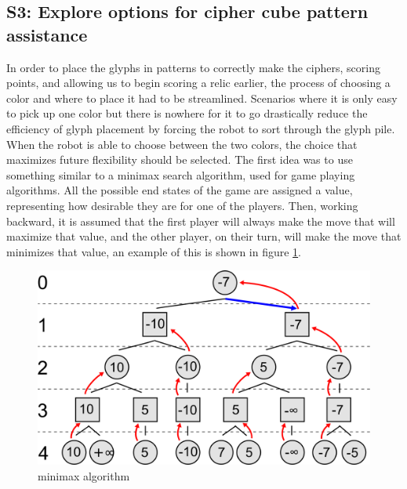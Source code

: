 \documentclass{article}
\begin{document}
\subsection{S3: Explore options for cipher cube pattern assistance}

In order to place the glyphs in patterns to correctly make the ciphers, scoring points, and allowing us to begin scoring a relic earlier, the process of choosing a color and where to place it had to be streamlined. Scenarios where it is only easy to pick up one color but there is nowhere for it to go drastically reduce the efficiency of glyph placement by forcing the robot to sort through the glyph pile. When the robot is able to choose between the two colors, the choice that maximizes future flexibility should be selected. The first idea was to use something similar to a minimax search algorithm, used for game playing algorithms. All the possible end states of the game are assigned a value, representing how desirable they are for one of the players. Then, working backward, it is assumed that the first player will always make the move that will maximize that value, and the other player, on their turn, will make the move that minimizes that value, an example of this is shown in figure \ref{fig:minimax}.
\begin{figure}[h]
    \centering
    \includegraphics[width=.6\textwidth]{01/images/minimax.png}
    \caption{minimax algorithm}
    \label{fig:minimax}
\end{figure}
\end{document}

